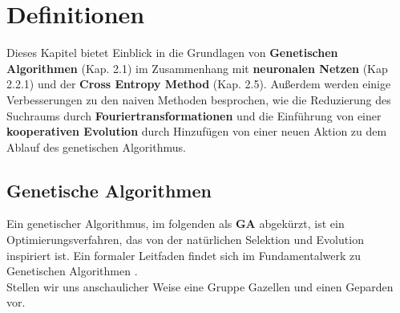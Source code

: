
\chapter{Definitionen}


Dieses Kapitel bietet Einblick in die Grundlagen von \textbf{Genetischen Algorithmen} (Kap. 2.1) im Zusammenhang mit \textbf{neuronalen Netzen} (Kap 2.2.1) und der \textbf{Cross Entropy Method} (Kap. 2.5). Außerdem werden einige Verbesserungen zu den naiven Methoden besprochen, wie die Reduzierung des Suchraums durch \textbf{Fouriertransformationen} und die Einführung von einer \textbf{kooperativen Evolution} durch Hinzufügen von einer neuen Aktion zu dem Ablauf des genetischen Algorithmus.

    \section{Genetische Algorithmen}


        Ein genetischer Algorithmus, im folgenden als \textbf{GA} abgekürzt, ist ein Optimierungsverfahren, das von der natürlichen Selektion und Evolution inspiriert ist. Ein formaler Leitfaden findet sich im Fundamentalwerk zu Genetischen Algorithmen \cite{ga}.\\[2mm]
        Stellen wir uns anschaulicher Weise eine Gruppe Gazellen und einen Geparden vor.\\

